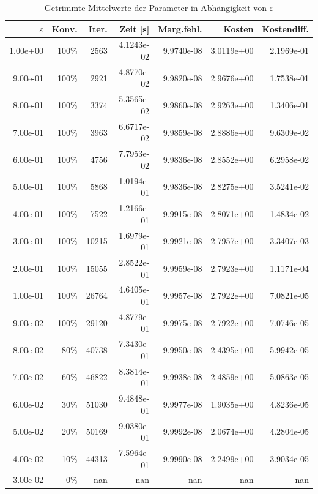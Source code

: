 \begin{table}[htbp]
\caption{Getrimmte Mittelwerte der Parameter in Abhängigkeit von $\varepsilon$}
\label{tab:Parametertest128_1}
\small
\centering
{}
\begin{tabular}{rrrrrrr}
\toprule
$\varepsilon$ & Konv. & Iter. & Zeit [s] & Marg.fehl. & Kosten & Kostendiff. \\
\midrule
1.00e+00 & 100\% & 2563 & 4.1243e-02 & 9.9740e-08 & 3.0119e+00 & 2.1969e-01 \\
9.00e-01 & 100\% & 2921 & 4.8770e-02 & 9.9820e-08 & 2.9676e+00 & 1.7538e-01 \\
8.00e-01 & 100\% & 3374 & 5.3565e-02 & 9.9860e-08 & 2.9263e+00 & 1.3406e-01 \\
7.00e-01 & 100\% & 3963 & 6.6717e-02 & 9.9859e-08 & 2.8886e+00 & 9.6309e-02 \\
6.00e-01 & 100\% & 4756 & 7.7953e-02 & 9.9836e-08 & 2.8552e+00 & 6.2958e-02 \\
5.00e-01 & 100\% & 5868 & 1.0194e-01 & 9.9836e-08 & 2.8275e+00 & 3.5241e-02 \\
4.00e-01 & 100\% & 7522 & 1.2166e-01 & 9.9915e-08 & 2.8071e+00 & 1.4834e-02 \\
3.00e-01 & 100\% & 10215 & 1.6979e-01 & 9.9921e-08 & 2.7957e+00 & 3.3407e-03 \\
2.00e-01 & 100\% & 15055 & 2.8522e-01 & 9.9959e-08 & 2.7923e+00 & 1.1171e-04 \\
1.00e-01 & 100\% & 26764 & 4.6405e-01 & 9.9957e-08 & 2.7922e+00 & 7.0821e-05 \\
9.00e-02 & 100\% & 29120 & 4.8779e-01 & 9.9975e-08 & 2.7922e+00 & 7.0746e-05 \\
8.00e-02 & 80\% & 40738 & 7.3430e-01 & 9.9950e-08 & 2.4395e+00 & 5.9942e-05 \\
7.00e-02 & 60\% & 46822 & 8.3814e-01 & 9.9938e-08 & 2.4859e+00 & 5.0863e-05 \\
6.00e-02 & 30\% & 51030 & 9.4848e-01 & 9.9977e-08 & 1.9035e+00 & 4.8236e-05 \\
5.00e-02 & 20\% & 50169 & 9.0380e-01 & 9.9992e-08 & 2.0674e+00 & 4.2804e-05 \\
4.00e-02 & 10\% & 44313 & 7.5964e-01 & 9.9990e-08 & 2.2499e+00 & 3.9034e-05 \\
3.00e-02 & 0\% & nan & nan & nan & nan & nan \\
\bottomrule
\end{tabular}
\end{table}
